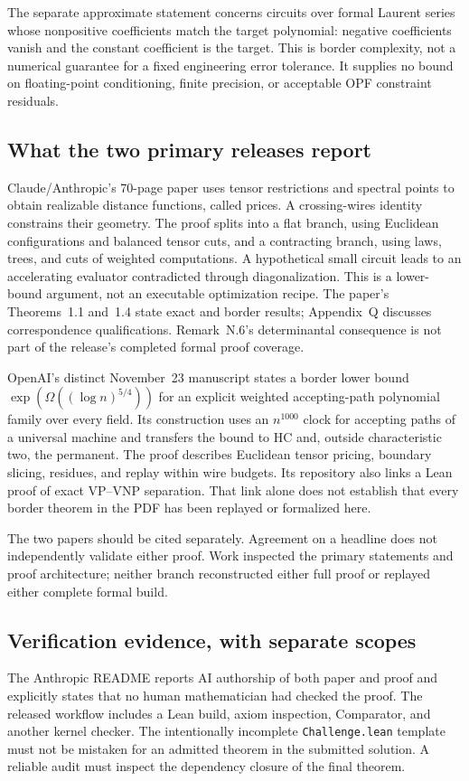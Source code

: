 \documentclass[11pt,letterpaper]{article}
\begin{document}
The separate approximate statement concerns circuits over formal Laurent series whose nonpositive coefficients match the target polynomial: negative coefficients vanish and the constant coefficient is the target. This is border complexity, not a numerical guarantee for a fixed engineering error tolerance. It supplies no bound on floating-point conditioning, finite precision, or acceptable OPF constraint residuals.\cite{anthropicstatement}

\subsection{What the two primary releases report}
Claude/Anthropic's 70-page paper uses tensor restrictions and spectral points to obtain realizable distance functions, called prices. A crossing-wires identity constrains their geometry. The proof splits into a flat branch, using Euclidean configurations and balanced tensor cuts, and a contracting branch, using laws, trees, and cuts of weighted computations. A hypothetical small circuit leads to an accelerating evaluator contradicted through diagonalization. This is a lower-bound argument, not an executable optimization recipe. The paper's Theorems~1.1 and~1.4 state exact and border results; Appendix~Q discusses correspondence qualifications. Remark~N.6's determinantal consequence is not part of the release's completed formal proof coverage.\cite{anthropic}

OpenAI's distinct November~23 manuscript states a border lower bound $\exp(\Omega((\log n)^{5/4}))$ for an explicit weighted accepting-path polynomial family over every field. Its construction uses an $n^{1000}$ clock for accepting paths of a universal machine and transfers the bound to HC and, outside characteristic two, the permanent. The proof describes Euclidean tensor pricing, boundary slicing, residues, and replay within wire budgets. Its repository also links a Lean proof of exact VP--VNP separation. That link alone does not establish that every border theorem in the PDF has been replayed or formalized here.\cite{openai}

The two papers should be cited separately. Agreement on a headline does not independently validate either proof. Work inspected the primary statements and proof architecture; neither branch reconstructed either full proof or replayed either complete formal build.

\subsection{Verification evidence, with separate scopes}
The Anthropic README reports AI authorship of both paper and proof and explicitly states that no human mathematician had checked the proof. The released workflow includes a Lean build, axiom inspection, Comparator, and another kernel checker. The intentionally incomplete \texttt{Challenge.lean} template must not be mistaken for an admitted theorem in the submitted solution. A reliable audit must inspect the dependency closure of the final theorem.\cite{anthropicrepo}
\end{document}
